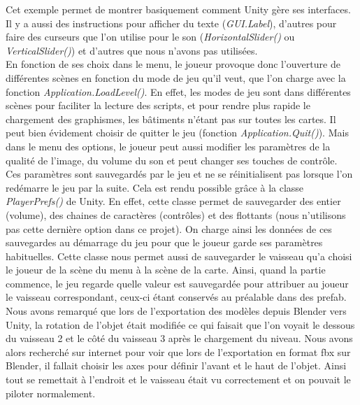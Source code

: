 \documentclass[12pt, titlepage]{article}
\begin{document}
\begin{spacing}{1.5}
Cet exemple permet de montrer basiquement comment Unity gère ses interfaces. Il y a aussi des instructions pour afficher du texte (\textit{GUI.Label}), d'autres pour faire des curseurs que l'on utilise pour le son (\textit{HorizontalSlider()} ou \textit{VerticalSlider()}) et d'autres que nous n'avons pas utilisées.\\

En fonction de ses choix dans le menu, le joueur provoque donc l'ouverture de différentes scènes en fonction du mode de jeu qu'il veut, que l'on charge avec la fonction \textit{Application.LoadLevel()}. En effet, les modes de jeu sont dans différentes scènes pour faciliter la lecture des scripts, et pour rendre plus rapide le chargement des graphismes, les bâtiments n'étant pas sur toutes les cartes. Il peut bien évidement choisir de quitter le jeu (fonction \textit{Application.Quit()}). Mais dans le menu des options, le joueur peut aussi modifier les paramètres de la qualité de l'image, du volume du son et peut changer ses touches de contrôle.\\

Ces paramètres sont sauvegardés par le jeu et ne se réinitialisent pas lorsque l'on redémarre le jeu par la suite. Cela est rendu possible grâce à la classe \textit{PlayerPrefs()} de Unity. En effet, cette classe permet de sauvegarder des entier (volume), des chaines de caractères (contrôles) et des flottants (nous n'utilisons pas cette dernière option dans ce projet). On charge ainsi les données de ces sauvegardes au démarrage du jeu pour que le joueur garde ses paramètres habituelles. Cette classe nous permet aussi de sauvegarder le vaisseau qu'a choisi le joueur de la scène du menu à la scène de la carte. Ainsi, quand la partie commence, le jeu regarde quelle valeur est sauvegardée pour attribuer au joueur le vaisseau correspondant, ceux-ci étant conservés au préalable dans des prefab.\\

 Nous avons remarqué que lors de l'exportation des modèles depuis Blender vers Unity, la rotation de l'objet était modifiée ce qui faisait que l'on voyait le dessous du vaisseau 2 et le côté du vaisseau 3 après le chargement du niveau. Nous avons alors recherché sur internet pour voir que lors de l'exportation en format fbx sur Blender, il fallait choisir les axes pour définir l'avant et le haut de l'objet. Ainsi tout se remettait à l'endroit et le vaisseau était vu correctement et on pouvait le piloter normalement.\\


\end{spacing}
\end{document}
